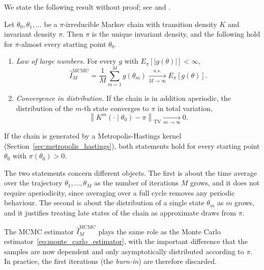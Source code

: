 We state the following result without proof; see \cite[Theorems~1 and~3, Corollary~2]{tierney1994markov} and \cite[Chapter~6]{robert2004monte}.
\begin{theorem}
    \label{thm:ergodic_theorem}
    Let $\theta_0,\theta_1,\ldots$ be a $\pi$-irreducible Markov chain with transition density $K$ and invariant density $\pi$. Then $\pi$ is the unique invariant density, and the following hold for $\pi$-almost every starting point $\theta_0$.
    \begin{enumerate}
        \item \emph{Law of large numbers.} For every $g$ with $E_\pi[|g(\theta)|]<\infty$,
        \begin{equation}
            \hat{I}_M^{\mathrm{MCMC}} = \frac{1}{M}\sum_{m=1}^{M} g(\theta_m) \xrightarrow[M\to\infty]{a.s.} E_\pi[g(\theta)].
        \end{equation}
        \item \emph{Convergence in distribution.} If the chain is in addition aperiodic, the distribution of the $m$-th state converges to $\pi$ in total variation,
        \begin{equation}
            \left\|K^m(\cdot\mid\theta_0) - \pi\right\|_{\mathrm{TV}} \xrightarrow[m\to\infty]{} 0.
        \end{equation}
    \end{enumerate}
    If the chain is generated by a Metropolis-Hastings kernel (Section~\ref{sec:metropolis_hastings}), both statements hold for every starting point $\theta_0$ with $\pi(\theta_0)>0$.
\end{theorem}

The two statements concern different objects. The first is about the time average over the trajectory $\theta_1,\ldots,\theta_M$ as the number of iterations $M$ grows, and it does not require aperiodicity, since averaging over a full cycle removes any periodic behaviour. The second is about the distribution of a single state $\theta_m$ as $m$ grows, and it justifies treating late states of the chain as approximate draws from $\pi$.

The MCMC estimator $\hat{I}_M^{\mathrm{MCMC}}$ plays the same role as the Monte Carlo estimator~\eqref{eq:monte_carlo_estimator}, with the important difference that the samples are now dependent and only asymptotically distributed according to $\pi$. In practice, the first iterations (the \emph{burn-in}) are therefore discarded.

